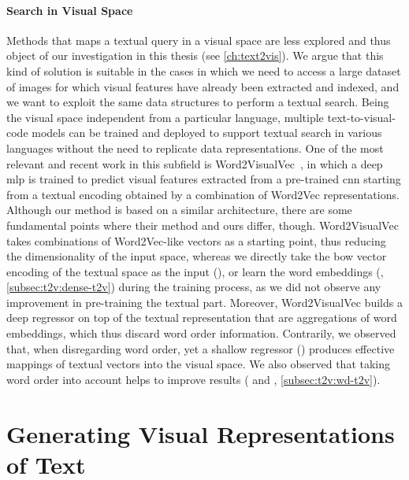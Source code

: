 \paragraph{Search in Visual Space}
Methods that maps a textual query in a visual space are less explored and thus object of our investigation in this thesis (see \ref{ch:text2vis}).
We argue that this kind of solution is suitable in the cases in which we need to access a large dataset of images for which visual features have already been extracted and indexed, and we want to exploit the same data structures to perform a textual search.
Being the visual space independent from a particular language, multiple text-to-visual-code models can be trained and deployed to support textual search in various languages without the need to replicate data representations.
One of the most relevant and recent work in this subfield is Word2VisualVec~\cite{dong2018predicting}, in which a deep \gls{mlp} is trained to predict visual features extracted from a pre-trained \gls{cnn} starting from a textual encoding obtained by a combination of Word2Vec representations.
Although our method is based on a similar architecture, there are some fundamental points where their method and ours differ, though.
Word2VisualVec takes combinations of Word2Vec-like vectors as a starting point, thus reducing the dimensionality of the input space, whereas we directly take the \acrlong{bow} vector encoding of the textual space as the input (\sparsettv{}), or learn the word embeddings (\densettv{}, \ref{subsec:t2v:dense-t2v}) during the training process, as we did not observe any improvement in pre-training the textual part.
Moreover, Word2VisualVec builds a deep regressor on top of the textual representation that are aggregations of word embeddings, which thus discard word order information.
Contrarily, we observed that, when disregarding word order, yet a shallow regressor (\sparsettv{}) produces effective mappings of textual vectors into the visual space.
We also observed that taking word order into account helps to improve results (\densettv{} and \widedeepttv{}, \ref{subsec:t2v:wd-t2v}).


\section{Generating Visual Representations of Text}
\label{sec:t2v:method}

